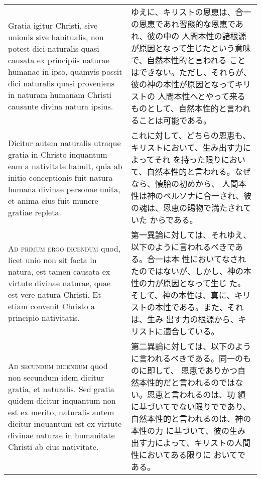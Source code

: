 \documentclass[10pt]{jsarticle} %
\begin{document}
\begin{longtable}{p{21em}p{21em}}
\\

Gratia igitur Christi, sive unionis sive habitualis, non potest dici
naturalis quasi causata ex principiis naturae humanae in ipso, quamvis
possit dici naturalis quasi proveniens in naturam humanam Christi
causante divina natura ipsius.



&


ゆえに、キリストの恩恵は、合一の恩恵であれ習態的な恩恵であれ、彼の中の
人間本性の諸根源が原因となって生じたという意味で、自然本性的と言われる
ことはできない。ただし、それらが、彼の神の本性が原因となってキリストの
人間本性へとやって来るものとして、自然本性的と言われることは可能である。

\\

Dicitur autem naturalis utraque gratia in Christo inquantum eam a
nativitate habuit, quia ab initio conceptionis fuit natura humana
divinae personae unita, et anima eius fuit munere gratiae repleta.


&

これに対して、どちらの恩恵も、キリストにおいて、生み出す力によってそれ
を持った限りにおいて、自然本性的と言われる。なぜなら、懐胎の初めから、
人間本性は神のペルソナに合一され、彼の魂は、恩恵の賜物で満たされていた
からである。

\\



{\scshape Ad primum ergo dicendum} quod, licet unio non sit facta in
natura, est tamen causata ex virtute divinae naturae, quae est vere
natura Christi. Et etiam convenit Christo a principio nativitatis.


&

第一異論に対しては、それゆえ、以下のように言われるべきである。合一は本
性においてなされたのではないが、しかし、神の本性の力が原因となって生じ
た。そして、神の本性は、真に、キリストの本性である。また、それは、生み
出す力の根源から、キリストに適合している。


\\



{\scshape Ad secundum dicendum} quod non secundum idem dicitur gratia,
et naturalis. Sed gratia quidem dicitur inquantum non est ex merito,
naturalis autem dicitur inquantum est ex virtute divinae naturae in
humanitate Christi ab eius nativitate.


&

第二異論に対しては、以下のように言われるべきである。同一のものに即して、
恩恵でありかつ自然本性的だと言われるのではない。恩恵と言われるのは、功
績に基づいてでない限りでであり、自然本性的と言われるのは、神の本性の力
に基づいて、彼の生み出す力によって、キリストの人間性においてある限りに
おいてである。


\end{longtable}
\end{document}
